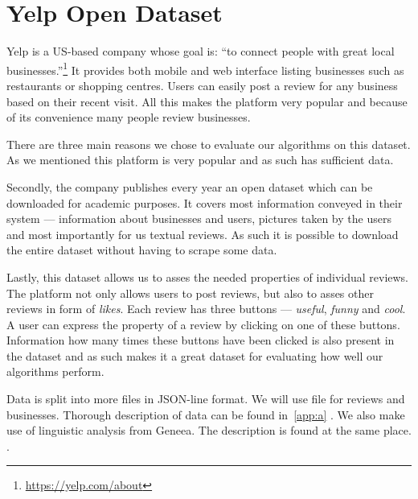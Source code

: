 \chapter{Yelp Open Dataset}

Yelp is a US-based company whose goal is: ``to connect people with great local businesses.''\footnote{\url{https://yelp.com/about}}
It provides both mobile and web interface listing businesses such as restaurants or shopping centres.
Users can easily post a review for any business based on their recent visit.
All this makes the platform very popular and because of its convenience many people review businesses.

There are three main reasons we chose to evaluate our algorithms on this dataset.
As we mentioned this platform is very popular and as such has sufficient data.

Secondly, the company publishes every year an open dataset which can be downloaded for academic
purposes.
It covers most information conveyed in their system ---  information about businesses and users, pictures taken by the users and most importantly for us textual reviews.
As such it is possible to download the entire dataset without having to scrape some data.

Lastly, this dataset allows us to asses the needed properties of individual reviews.
The platform not only allows users to post reviews, but also to asses other reviews in form of \emph{likes}.
Each review has three buttons --- \emph{useful}, \emph{funny} and \emph{cool}.
A user can express the property of a review by clicking on one of these buttons. Information how many times these buttons have been clicked is also present in the dataset and as such makes it a great dataset for evaluating how well our algorithms perform.

Data is split into more files in JSON-line format. We will use file for reviews and businesses.
Thorough description of data can be found in~\autoref{app:a} .
We also make use of linguistic analysis from Geneea. The description is found at the same place.
.

